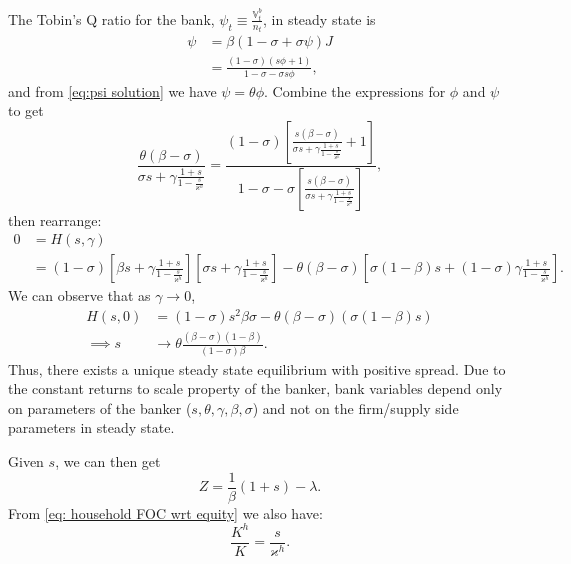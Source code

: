 \documentclass[12pt,english]{extarticle}
\begin{document}
	The Tobin's Q ratio for the bank, $\psi_t \equiv \frac{\mathbb{V}_t^b}{n_t}$, in steady state is \begin{equation*}
		\begin{split}
			\psi &= \beta(1-\sigma+\sigma\psi)J \\
			&= \frac{(1-\sigma)(s\phi + 1)}{1-\sigma-\sigma s\phi},
		\end{split}
	\end{equation*}
	and from \eqref{eq:psi solution} we have $\psi = \theta\phi$. Combine the expressions for $\phi$ and $\psi$ to get
	\begin{equation*}
		\frac{\theta(\beta-\sigma)}{\sigma s + \gamma\frac{1+s}{1-\frac{s}{\varkappa^h}}} = \frac{(1-\sigma)\left[\frac{s(\beta-\sigma)}{\sigma s + \gamma\frac{1+s}{1-\frac{s}{\varkappa^h}}} + 1\right]}{1-\sigma - \sigma\left[\frac{s(\beta-\sigma)}{\sigma s + \gamma\frac{1+s}{1-\frac{s}{\varkappa^h}}}\right]},
	\end{equation*}
	then rearrange:
	\begin{equation*}
		\begin{split}
			0 &= H(s,\gamma) \\
			&= (1-\sigma)\left[\beta s + \gamma\frac{1+s}{1-\frac{s}{\varkappa^h}}\right]\left[\sigma s + \gamma\frac{1+s}{1-\frac{s}{\varkappa^h}}\right] - \theta(\beta-\sigma)\left[\sigma(1-\beta)s + (1-\sigma)\gamma\frac{1+s}{1-\frac{s}{\varkappa^h}}\right].
		\end{split}
	\end{equation*}
	We can observe that as $\gamma \rightarrow 0$,
	\begin{equation*}
		\begin{split}
			H(s,0) &= (1-\sigma)s^2\beta\sigma - \theta(\beta-\sigma)\left(\sigma(1-\beta)s\right) \\
			\implies s &\rightarrow \theta\frac{(\beta-\sigma)(1-\beta)}{(1-\sigma)\beta}.
		\end{split}
	\end{equation*}
	Thus, there exists a unique steady state equilibrium with positive spread. Due to the constant returns to scale property of the banker, bank variables depend only on parameters of the banker ($s,\theta,\gamma,\beta,\sigma$) and not on the firm/supply side parameters in steady state.
	
	Given $s$, we can then get 
	\begin{equation*}
		Z = \frac{1}{\beta}(1+s) - \lambda.
	\end{equation*}
	From \eqref{eq: household FOC wrt equity} we also have:
	\begin{equation*}
		\frac{K^h}{K} = \frac{s}{\varkappa^h}.
	\end{equation*}
	
\end{document}
